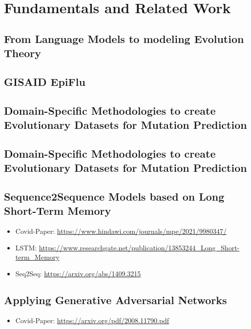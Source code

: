 \section{Fundamentals and Related Work} \label{fundamentals}

\subsection{From Language Models to modeling Evolution Theory} \label{fundamentalsA}

\subsection{GISAID EpiFlu} \label{fundamentalsB}

\subsection{Domain-Specific Methodologies to create Evolutionary  Datasets for Mutation Prediction} \label{fundamentalsC}

\subsection{Domain-Specific Methodologies to create Evolutionary  Datasets for Mutation Prediction} \label{fundamentalsD}

\subsection{Sequence2Sequence Models based on Long Short-Term Memory} \label{fundamentalsE}

\begin{itemize}
	\item Covid-Paper: \url{https://www.hindawi.com/journals/mpe/2021/9980347/}
	\item LSTM: \url{https://www.researchgate.net/publication/13853244_Long_Short-term_Memory}
	\item Seq2Seq: \url{https://arxiv.org/abs/1409.3215}
\end{itemize}


\subsection{Applying Generative Adversarial Networks} \label{fundamentalsF}

\begin{itemize}
	\item Covid-Paper: \url{https://arxiv.org/pdf/2008.11790.pdf}
\end{itemize}


